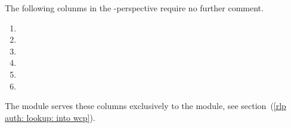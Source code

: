 The following colunms in the \computation{}-perspective require no further comment.
\begin{enumerate}
	\item \rlpAuthComputationInst{}
	\item \rlpAuthComputationArgOneHi{}
	\item \rlpAuthComputationArgOneLo{}
	\item \rlpAuthComputationArgTwoHi{}
	\item \rlpAuthComputationArgTwoLo{}
	\item \rlpAuthComputationRes{}
\end{enumerate}
\saNote{}
The \rlpAuthMod{} module serves these columns exclusively to the \wcpMod{} module,
see section~(\ref{rlp auth: lookup: into wcp}).
